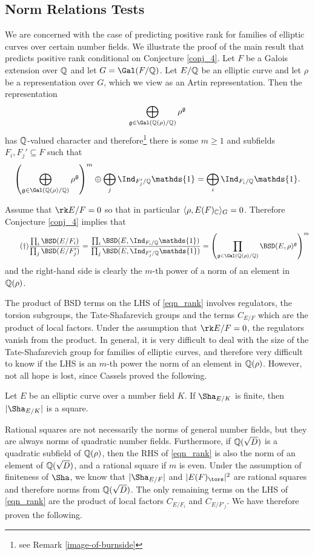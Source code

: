 \subsection{Norm Relations Tests}\label{sec-norm-rels-test}
We are concerned with the case of predicting positive rank for families of elliptic curves over certain number fields. We illustrate the proof of the main result that predicts positive rank conditional on Conjecture \ref{conj_4}. Let $F$ be a Galois extension over $\mathbb{Q}$ and let $G=\Gal(F/\QQ)$. Let $E/\mathbb{Q}$ be an elliptic curve and let $\rho$ be a representation over $G$, which we view as an Artin representation. Then the representation 
$$\bigoplus_{\mathfrak{g}\in\Gal(\QQ(\rho)/\QQ)}\rho^{\mathfrak{g}}$$
has $\mathbb{Q}$-valued character and therefore\footnote{see Remark \ref{image-of-burnside}} there is some $m\geq 1$ and subfields $F_i, F_j' \subseteq F$ such that 
$$\left(\bigoplus_{\mathfrak{g}\in\Gal(\QQ(\rho)/\QQ)}\rho^{\mathfrak{g}}\right)^m\oplus\bigoplus_j\Ind_{F'_j/\QQ}\mathds{1}=\bigoplus_i\Ind_{F_i/\QQ}\mathds{1}.$$

Assume that $\rk E/F=0$ so that in particular $\langle \rho, E(F)_{\mathbb{C}}\rangle_G=0$. Therefore Conjecture \ref{conj_4} implies that 
\begin{equation}\label{eqn_rank}\tag{\textdagger}
    \frac{\prod_i\BSD(E/F_i)}{\prod_j\BSD(E/F'_j)}=\frac{\prod_i\BSD(E,\Ind_{F_i/\QQ}\mathds{1})}{\prod_j\BSD(E, \Ind_{F'_j/\QQ}\mathds{1})}=\left(\prod_{\mathfrak{g}\in\Gal(\QQ(\rho)/\QQ)}\BSD(E,\rho)^{\mathfrak{g}}\right)^m
\end{equation}
and the right-hand side is clearly the $m$-th power of a norm of an element in $\mathbb{Q}(\rho)$. 

The product of BSD terms on the LHS of \eqref{eqn_rank} involves regulators, the torsion subgroups, the Tate-Shafarevich groups and the terms $C_{E/F}$ which are the product of local factors. Under the assumption that $\rk E/F=0$, the regulators vanish from the product. In general, it is very difficult to deal with the size of the Tate-Shafarevich group for families of elliptic curves, and therefore very difficult to know if the LHS is an $m$-th power the norm of an element in $\mathbb{Q}(\rho)$. However, not all hope is lost, since Cassels proved the following.

\begin{thm}
    Let $E$ be an elliptic curve over a number field $K$. If $\Sha_{E/K}$ is finite, then $|\Sha_{E/K}|$ is a square.
\end{thm}

Rational squares are not necessarily the norms of general number fields, but they are always norms of quadratic number fields. Furthermore, if $\mathbb{Q}(\sqrt{D})$ is a quadratic subfield of $\mathbb{Q}(\rho)$, then the RHS of \eqref{eqn_rank} is also the norm of an element of $\mathbb{Q}(\sqrt{D})$, and a rational square if $m$ is even. Under the assumption of finiteness of $\Sha$, we know that $|\Sha_{E/F}|$ and $|E(F)_{\tors}|^2$ are rational squares and therefore norms from $\mathbb{Q}(\sqrt{D})$. The only remaining terms on the LHS of \eqref{eqn_rank} are the product of local factors $C_{E/F_i}$ and $C_{E/F'_j}$. We have therefore proven the following.

